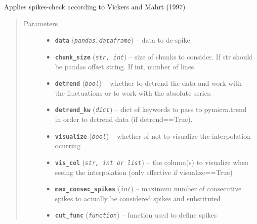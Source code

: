 \documentclass[a4paper,10pt,oneside]{sphinxmanual}
\begin{document}

\begin{fulllineitems}
\label{pymicra:pymicra.tests.check_spikes}
Applies spikes-check according to Vickers and Mahrt (1997)
\begin{quote}\begin{description}
\item[{Parameters}] \leavevmode\begin{itemize}
\item {} 
\textbf{\texttt{data}} (\emph{\texttt{pandas.dataframe}}) -- data to de-spike

\item {} 
\textbf{\texttt{chunk\_size}} (\emph{\texttt{str, int}}) -- size of chunks to consider. If str should be pandas offset string. If int, number of lines.

\item {} 
\textbf{\texttt{detrend}} (\emph{\texttt{bool}}) -- whether to detrend the data and work  with the fluctuations or to work with the absolute series.

\item {} 
\textbf{\texttt{detrend\_kw}} (\emph{\texttt{dict}}) -- dict of keywords to pass to pymicra.trend in order to detrend data (if detrend==True).

\item {} 
\textbf{\texttt{visualize}} (\emph{\texttt{bool}}) -- whether of not to visualize the interpolation ocurring

\item {} 
\textbf{\texttt{vis\_col}} (\emph{\texttt{str, int or list}}) -- the column(s) to visualize when seeing the interpolation (only effective if visualize==True)

\item {} 
\textbf{\texttt{max\_consec\_spikes}} (\emph{\texttt{int}}) -- maximum number of consecutive spikes to actually be considered spikes and substituted

\item {} 
\textbf{\texttt{cut\_func}} (\emph{\texttt{function}}) -- function used to define spikes


\end{itemize}
\end{description}
\end{quote}
\end{fulllineitems}
\end{document}
